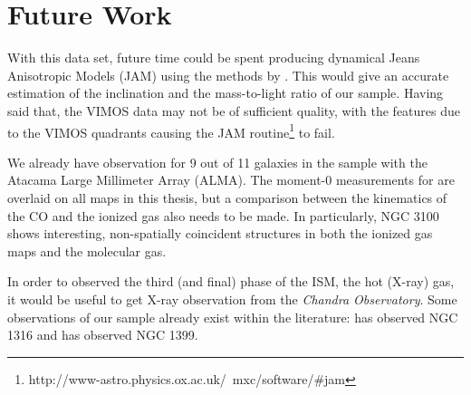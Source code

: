 \section{Future Work}
	\label{sec:future}
	With this data set, future time could be spent producing dynamical Jeans Anisotropic Models (JAM) using the methods by \citet{Cappellari2008}. This would give an accurate estimation of the inclination and the mass-to-light ratio of our sample. Having said that, the VIMOS data may not be of sufficient quality, with the features due to the VIMOS quadrants causing the \textsc{JAM} routine\footnote{http://www-astro.physics.ox.ac.uk/~mxc/software/\#jam} to fail. 

	We already have observation for 9 out of 11 galaxies in the sample with the Atacama Large Millimeter Array (ALMA). The moment-0 measurements for  are overlaid on all maps in this thesis, but a comparison between the kinematics of the CO and the ionized gas also needs to be made. In particularly, NGC 3100 shows interesting, non-spatially coincident structures in both the ionized gas maps and the molecular gas.

	In order to observed the third (and final) phase of the ISM, the hot (X-ray) gas, it would be useful to get X-ray observation from the \textit{Chandra Observatory}. Some observations of our sample already exist within the literature: \citet{Lanz2010} has observed NGC 1316 and \citet{Su2017} has observed NGC 1399. 

